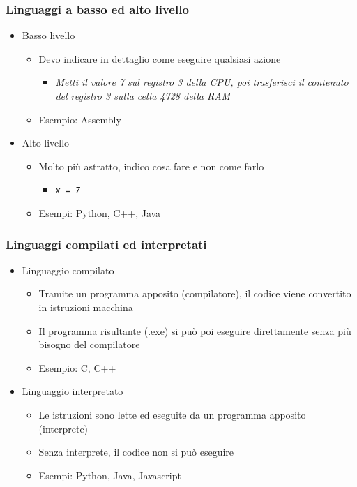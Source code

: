\begin{exampleframe}
    \frametitle{Linguaggi a basso ed alto livello}

    \begin{itemize}
        \item Basso livello
        \begin{itemize}
            \item Devo indicare in dettaglio come eseguire qualsiasi azione
            \begin{itemize}
                \item \textit{Metti il valore 7 sul registro 3 della CPU, poi trasferisci il contenuto del registro 3 sulla cella 4728 della RAM} 
            \end{itemize}
            \item Esempio: Assembly
        \end{itemize}

        \bigskip
        \item Alto livello
        \begin{itemize}
            \item Molto più astratto, indico cosa fare e non come farlo
            \begin{itemize}
                \item \textit{\texttt{x = 7}}
            \end{itemize}
            \item Esempi: Python, C++, Java
        \end{itemize}
    \end{itemize}
\end{exampleframe}

\begin{exampleframe}
    \frametitle{Linguaggi compilati ed interpretati}

    \begin{itemize}
        \item Linguaggio compilato
        \begin{itemize}
            \item Tramite un programma apposito (compilatore), il codice viene convertito in istruzioni macchina
            \item Il programma risultante (.exe) si può poi eseguire direttamente senza più bisogno del compilatore
            \item Esempio: C, C++
        \end{itemize}

        \bigskip
        \item Linguaggio interpretato
        \begin{itemize}
            \item Le istruzioni sono lette ed eseguite da un programma apposito (interprete)
            \item Senza interprete, il codice non si può eseguire
            \item Esempi: Python, Java, Javascript
        \end{itemize}
    \end{itemize}
\end{exampleframe}

